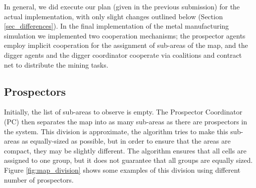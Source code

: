 In general, we did execute our plan (given in the previous submission) for the actual implementation, with only slight changes outlined below (Section \ref{sec_differences}). In the final implementation of the metal manufacturing simulation we implemented two cooperation mechanisms; the prospector agents employ implicit cooperation for the assignment of sub-areas of the map, and the digger agents and the digger coordinator cooperate via coalitions and contract net to distribute the mining tasks. 

\subsection{Prospectors}

Initially, the list of sub-areas to observe is empty. The Prospector Coordinator (PC) then separates the map into as many sub-areas as there are prospectors in the system. This division is approximate, the algorithm tries to make this sub-areas as equally-sized as possible, but in order to ensure that the areas are compact, they may be slightly different. The algorithm ensures that all cells are assigned to one group, but it does not guarantee that all groups are equally sized. Figure \ref{fig:map_division} shows some examples of this division using different number of prospectors.

